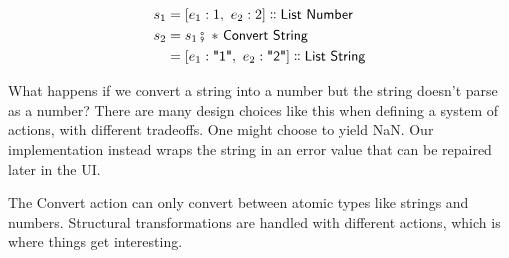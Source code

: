 \documentclass[english,submission]{programming}
\newcommand{\mathbox}[1]{\colorbox{black!10}{$#1$}}
\DeclareMathOperator{\exec}{\fatsemi\ }
\newcommand{\isa}{\dblcolon}
\newcommand{\quotedstring}[1]{\textsf{\textquotedbl{#1}\textquotedbl}}
\begin{document}
\begin{align*}
s_1 &= [ e_1: 1,\  e_2: 2] \isa \textsf{List Number}\\
s_2 &= s_1 \exec * \textsf{ Convert } \textsf{String}\\
    &= [ e_1: \quotedstring{1},\  e_2: \quotedstring{2}] \isa \textsf{List String}\\
\end{align*}

What happens if we convert a string into a number but the string doesn't parse as a number? There are many design choices like this when defining a system of actions, with different tradeoffs. One might choose to yield \textsf{NaN}. Our implementation instead wraps the string in an error value that can be repaired later in the UI.

The \textsf{Convert} action can only convert between atomic types like strings and numbers. Structural transformations are handled with different actions, which is where things get interesting.





\end{document}
